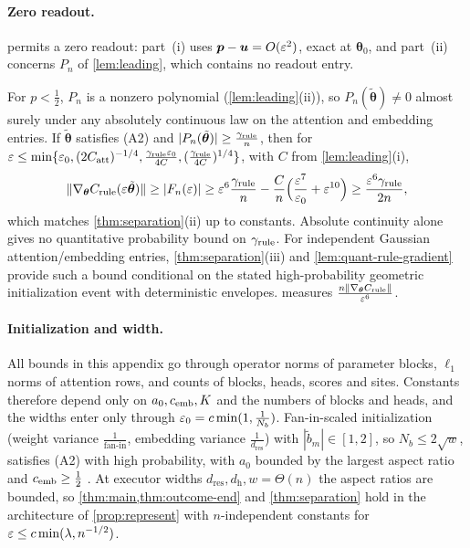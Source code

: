 \paragraph{Zero readout.}\label{rem:zero-readout}  permits a zero readout: part~(i) uses $\bm p-\bm u=O(\varepsilon^2)$, exact at $\bm\theta_0$, and part~(ii) concerns $P_n$ of
\cref{lem:leading}, which contains no readout entry.


\begin{remark}
\label{rem:generic-rule}
For $p<\frac{1}{2}$, $P_n$ is a nonzero polynomial (\cref{lem:leading}(ii)), so $P_n(\tilde{\bm\theta})\ne0$ almost surely under any absolutely continuous law on
the attention and embedding entries. If $\tilde{\bm\theta}$ satisfies (A2) and $|P_n(\tilde{\bm\theta})|\ge\frac{\gamma_{\mathrm{rule}}}{n}$, then for
$\varepsilon\le\min\{\varepsilon_0,(2C_{\mathrm{att}})^{-1/4},\frac{\gamma_{\mathrm{rule}}\varepsilon_0}{4C},(\frac{\gamma_{\mathrm{rule}}}{4C})^{1/4}\}$, with $C$ from \cref{lem:leading}(i),
\[
 \|\nabla_{\bm\theta}C_{\mathrm{rule}}(\varepsilon\tilde{\bm\theta})\|\ge|F_n(\varepsilon)|\ge\varepsilon^6\frac{\gamma_{\mathrm{rule}}}{n}-\frac{C}{n}\Bigl(\frac{\varepsilon^7}{\varepsilon_0}+\varepsilon^{10}\Bigr)\ge\frac{\varepsilon^6\gamma_{\mathrm{rule}}}{2n},
\]
which matches \cref{thm:separation}(ii) up to constants. Absolute continuity alone
gives no quantitative probability bound on $\gamma_{\mathrm{rule}}$. For independent Gaussian
attention/embedding entries, \cref{thm:separation}(iii) and
\cref{lem:quant-rule-gradient} provide such a bound conditional on the stated
high-probability geometric initialization event with deterministic envelopes.  measures $\frac{n\|\nabla_{\bm\theta}C_{\mathrm{rule}}\|}{\varepsilon^6}$.
\end{remark}

\paragraph{Initialization and width.}
\label{rem:end-width}
All bounds in this appendix go through operator norms of parameter blocks, $\ell_1$ norms of attention rows, and counts of blocks,
heads, scores and sites. Constants therefore depend only on $a_0,c_{\mathrm{emb}},K$ and the numbers of blocks and heads, and the widths enter only
through $\varepsilon_0=c\min(1,\frac{1}{N_b})$. Fan-in-scaled initialization (weight variance $\frac{1}{\text{fan-in}}$, embedding variance $\frac{1}{d_{\mathrm{res}}}$) with
$|\tilde b_m|\in[1,2]$, so $N_b\le2\sqrt w$, satisfies (A2) with high probability, with $a_0$ bounded by the largest aspect ratio and $c_{\mathrm{emb}}\ge\frac{1}{2}$
\citep[Thms.~4.4.5, 4.6.1]{vershynin2018high}. At executor widths $d_{\mathrm{res}},d_{\mathrm h},w=\Theta(n)$ the aspect ratios are bounded, so
\cref{thm:main,thm:outcome-end} and \cref{thm:separation} hold in the architecture of \cref{prop:represent} with $n$-independent constants for
$\varepsilon\le c\min(\lambda,n^{-1/2})$.


